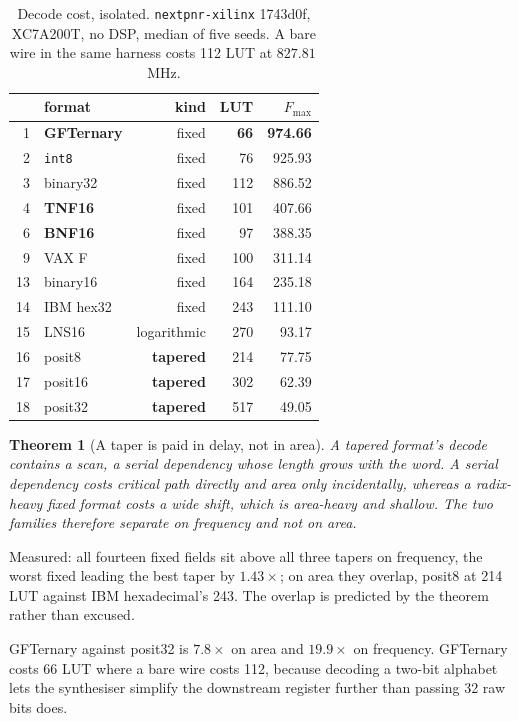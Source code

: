 \documentclass[11pt]{article}
\newtheorem{theorem}{Theorem}
\theoremstyle{definition}
\begin{document}
\begin{table}[t]\centering
\caption{Decode cost, isolated. \texttt{nextpnr-xilinx} 1743d0f, XC7A200T, no
DSP, median of five seeds. A bare wire in the same harness costs 112 LUT at
$827.81$\,MHz.}
\label{tab:cleandecode}
\small
\begin{tabular}{rlrrr}
\toprule
& format & kind & LUT & $F_{\max}$ \\
\midrule
1 & \textbf{GFTernary} & fixed & \textbf{66} & \textbf{974.66} \\
2 & \texttt{int8} & fixed & 76 & 925.93 \\
3 & binary32 & fixed & 112 & 886.52 \\
4 & \textbf{TNF16} & fixed & 101 & 407.66 \\
6 & \textbf{BNF16} & fixed & 97 & 388.35 \\
9 & VAX F & fixed & 100 & 311.14 \\
13 & binary16 & fixed & 164 & 235.18 \\
14 & IBM hex32 & fixed & 243 & 111.10 \\
15 & LNS16 & logarithmic & 270 & 93.17 \\
16 & posit8 & \textbf{tapered} & 214 & 77.75 \\
17 & posit16 & \textbf{tapered} & 302 & 62.39 \\
18 & posit32 & \textbf{tapered} & 517 & 49.05 \\
\bottomrule
\end{tabular}
\end{table}

\begin{theorem}[A taper is paid in delay, not in area]
\label{thm:taperdelay}
A tapered format's decode contains a scan, a serial dependency whose length grows
with the word. A serial dependency costs critical path directly and area only
incidentally, whereas a radix-heavy fixed format costs a wide shift, which is
area-heavy and shallow. The two families therefore separate on frequency and not
on area.
\end{theorem}

Measured: all fourteen fixed fields sit above all three tapers on frequency, the
worst fixed leading the best taper by $1.43\times$; on area they overlap, posit8
at 214 LUT against IBM hexadecimal's 243. The overlap is predicted by the theorem
rather than excused.

GFTernary against posit32 is $7.8\times$ on area and $19.9\times$ on frequency.
GFTernary costs 66 LUT where a bare wire costs 112, because decoding a two-bit
alphabet lets the synthesiser simplify the downstream register further than
passing 32 raw bits does.
\end{document}
